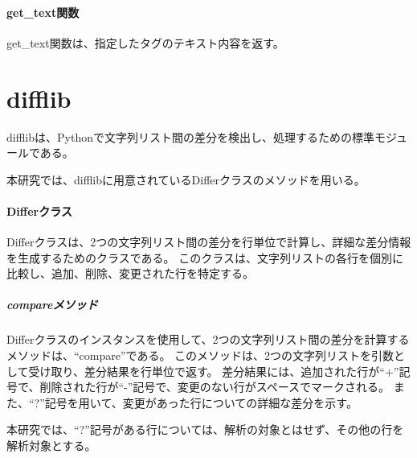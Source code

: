 \paragraph{get\_text関数}
get\_text関数は、指定したタグのテキスト内容を返す。

\section{difflib}\label{sec:difflib}
difflib\cite{difflib}は、Pythonで文字列リスト間の差分を検出し、処理するための標準モジュールである。
\par
本研究では、difflibに用意されているDifferクラスのメソッドを用いる。
\paragraph{Differクラス}
Differクラスは、2つの文字列リスト間の差分を行単位で計算し、詳細な差分情報を生成するためのクラスである。
このクラスは、文字列リストの各行を個別に比較し、追加、削除、変更された行を特定する。
\subparagraph{compareメソッド}
Differクラスのインスタンスを使用して、2つの文字列リスト間の差分を計算するメソッドは、“compare”である。
このメソッドは、2つの文字列リストを引数として受け取り、差分結果を行単位で返す。
差分結果には、追加された行が“+”記号で、削除された行が“-”記号で、変更のない行がスペースでマークされる。
また、“?”記号を用いて、変更があった行についての詳細な差分を示す。
\par
本研究では、“?”記号がある行については、解析の対象とはせず、その他の行を解析対象とする。

